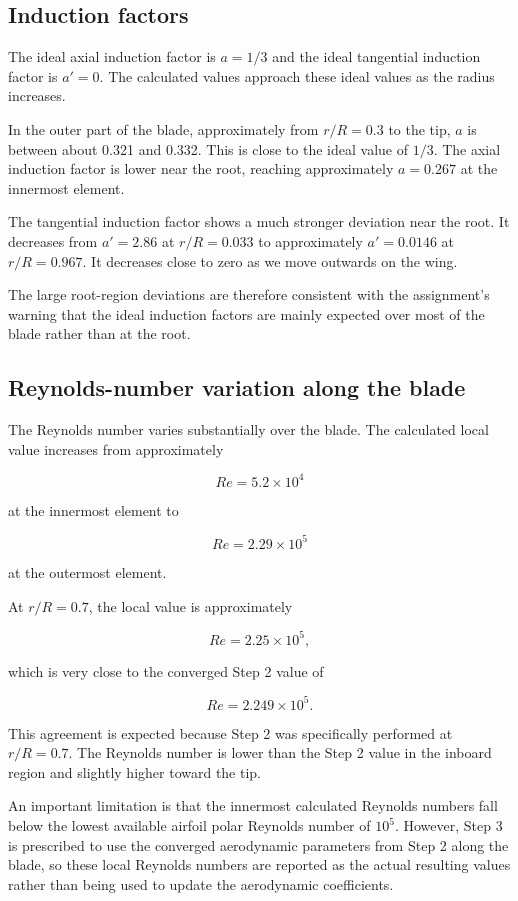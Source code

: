 \documentclass[11pt,a4paper]{article}
\begin{document}
\subsection{Induction factors}

The ideal axial induction factor is $a=1/3$ and the ideal tangential
induction factor is $a'=0$. The calculated values approach these ideal
values as the radius increases.

In the outer part of the blade, approximately from $r/R=0.3$ to the tip,
$a$ is between about 0.321 and 0.332. This is close to the ideal value of
$1/3$. The axial induction factor is lower near the root, reaching
approximately $a=0.267$ at the innermost element.

The tangential induction factor shows a much stronger deviation near the
root. It decreases from $a'=2.86$ at $r/R=0.033$ to approximately
$a'=0.0146$ at $r/R=0.967$. It decreases close to zero as we move outwards on the wing.

The large root-region deviations are therefore consistent with the
assignment's warning that the ideal induction factors are mainly expected
over most of the blade rather than at the root.

\subsection{Reynolds-number variation along the blade}

The Reynolds number varies substantially over the blade. The calculated
local value increases from approximately

\[
Re=5.2\times10^4
\]

at the innermost element to

\[
Re=2.29\times10^5
\]

at the outermost element.

At $r/R=0.7$, the local value is approximately

\[
Re=2.25\times10^5,
\]

which is very close to the converged Step 2 value of

\[
Re=2.249\times10^5.
\]

This agreement is expected because Step 2 was specifically performed at
$r/R=0.7$. The Reynolds number is lower than the Step 2 value in the
inboard region and slightly higher toward the tip.

An important limitation is that the innermost calculated Reynolds numbers
fall below the lowest available airfoil polar Reynolds number of $10^5$.
However, Step 3 is prescribed to use the converged aerodynamic parameters
from Step 2 along the blade, so these local Reynolds numbers are reported as
the actual resulting values rather than being used to update the
aerodynamic coefficients.
\end{document}
